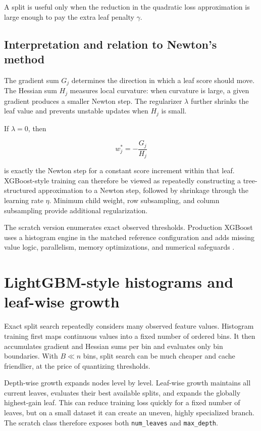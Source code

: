 \documentclass[11pt]{article}
\newcommand{\code}[1]{\texttt{#1}}
\begin{document}
A split is useful only when the reduction in the quadratic loss approximation
is large enough to pay the extra leaf penalty $\gamma$.

\subsection{Interpretation and relation to Newton's method}

The gradient sum $G_j$ determines the direction in which a leaf score should
move. The Hessian sum $H_j$ measures local curvature: when curvature is large,
a given gradient produces a smaller Newton step. The regularizer $\lambda$
further shrinks the leaf value and prevents unstable updates when $H_j$ is
small.

If $\lambda=0$, then

\[
 w_j^*=-\frac{G_j}{H_j}
\]

is exactly the Newton step for a constant score increment within that leaf.
XGBoost-style training can therefore be viewed as repeatedly constructing a
tree-structured approximation to a Newton step, followed by shrinkage through
the learning rate $\eta$. Minimum child weight, row subsampling, and column
subsampling provide additional regularization.

The scratch version enumerates exact observed thresholds. Production XGBoost
uses a histogram engine in the matched reference configuration and adds missing
value logic, parallelism, memory optimizations, and numerical safeguards
\cite{xgboost}.

\section{LightGBM-style histograms and leaf-wise growth}

Exact split search repeatedly considers many observed feature values. Histogram
training first maps continuous values into a fixed number of ordered bins. It
then accumulates gradient and Hessian sums per bin and evaluates only bin
boundaries. With $B\ll n$ bins, split search can be much cheaper and cache
friendlier, at the price of quantizing thresholds.

Depth-wise growth expands nodes level by level. Leaf-wise growth maintains all
current leaves, evaluates their best available splits, and expands the globally
highest-gain leaf. This can reduce training loss quickly for a fixed number of
leaves, but on a small dataset it can create an uneven, highly specialized
branch. The scratch class therefore exposes both \code{num\_leaves} and
\code{max\_depth}.
\end{document}
